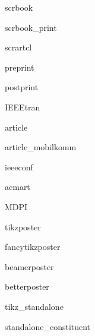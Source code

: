 \def\DenKrCompilerVALLua{LuaLaTeX}%
\def\DenKrCompilerVALPdf{pdfLaTeX}%
\newcommand{\DenKrCompiler}{LuaLaTeX}%
%
\newcommand{\DenKrJPFont}{0}%
%
%
%
%
%
%
\providecommand{\DenKrDocGenre}{}%
\newcommand{\setDocGenreIf}[3]{
	\edef\argI{\DenKrLayout}%
	\def\argII{#2}%
	\ifx\argI\argII%
		\renewcommand{\DenKrDocGenre}{#1}%
	\else%
		#3%
	\fi%
}%
\setDocGenreIf{elaborate}{scrbook}{%
\setDocGenreIf{elaborate}{scrbook_print}{%
\setDocGenreIf{elaborate}{scrartcl}{%
\setDocGenreIf{dedicated_poster}{preprint}{%
\setDocGenreIf{dedicated_poster}{postprint}{%
\setDocGenreIf{dedicated_poster}{IEEEtran}{%
\setDocGenreIf{dedicated_poster}{article}{%
\setDocGenreIf{dedicated_poster}{article_mobilkomm}{%
\setDocGenreIf{dedicated_poster}{ieeeconf}{%
\setDocGenreIf{dedicated_poster}{acmart}{%
\setDocGenreIf{dedicated_poster}{MDPI}{%
\setDocGenreIf{dedicated_poster}{tikzposter}{%
\setDocGenreIf{dedicated_poster}{fancytikzposter}{%
\setDocGenreIf{dedicated_poster}{beamerposter}{%
\setDocGenreIf{dedicated_poster}{betterposter}{%
%
\setDocGenreIf{internal}{tikz_standalone}{%
\setDocGenreIf{internal}{standalone_constituent}{%
}}}}}}}}}}}}}}}}}%
%
%
%
%
%
%
\newcommand{\DenKrLayoutCommonDirPATH}{1common}%
\newcommand{\DenKrLayoutCommonDir}{\DenKrSubDirPrefix\DenKrLayoutBaseRootDirPATH/\DenKrLayoutCommonDirPATH}%